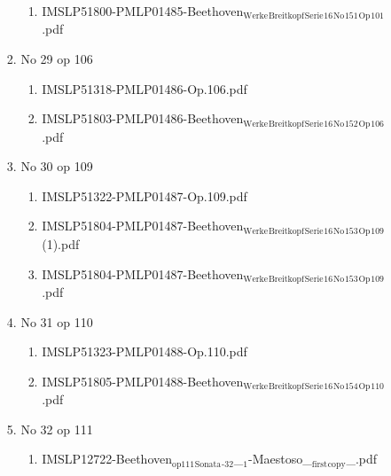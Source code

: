 \documentclass[11pt]{article}
\begin{document}
\begin{enumerate}
\begin{enumerate}
\begin{enumerate}
\begin{enumerate}
\item IMSLP51800-PMLP01485-Beethoven$_{\text{Werke}}$$_{\text{Breitkopf}}$$_{\text{Serie}}$$_{\text{16}}$$_{\text{No}}$$_{\text{151}}$$_{\text{Op}}$$_{\text{101}}$.pdf
\label{sec-1-1-1-1-44-9-6-8-65-3}
\end{enumerate}

\item No 29 op 106
\label{sec-1-1-1-1-44-9-6-8-66}
\begin{enumerate}
\item IMSLP51318-PMLP01486-Op.106.pdf
\label{sec-1-1-1-1-44-9-6-8-66-1}

\item IMSLP51803-PMLP01486-Beethoven$_{\text{Werke}}$$_{\text{Breitkopf}}$$_{\text{Serie}}$$_{\text{16}}$$_{\text{No}}$$_{\text{152}}$$_{\text{Op}}$$_{\text{106}}$.pdf
\label{sec-1-1-1-1-44-9-6-8-66-2}
\end{enumerate}

\item No 30 op 109
\label{sec-1-1-1-1-44-9-6-8-67}
\begin{enumerate}
\item IMSLP51322-PMLP01487-Op.109.pdf
\label{sec-1-1-1-1-44-9-6-8-67-1}

\item IMSLP51804-PMLP01487-Beethoven$_{\text{Werke}}$$_{\text{Breitkopf}}$$_{\text{Serie}}$$_{\text{16}}$$_{\text{No}}$$_{\text{153}}$$_{\text{Op}}$$_{\text{109}}$ (1).pdf
\label{sec-1-1-1-1-44-9-6-8-67-2}

\item IMSLP51804-PMLP01487-Beethoven$_{\text{Werke}}$$_{\text{Breitkopf}}$$_{\text{Serie}}$$_{\text{16}}$$_{\text{No}}$$_{\text{153}}$$_{\text{Op}}$$_{\text{109}}$.pdf
\label{sec-1-1-1-1-44-9-6-8-67-3}
\end{enumerate}

\item No 31 op 110
\label{sec-1-1-1-1-44-9-6-8-68}
\begin{enumerate}
\item IMSLP51323-PMLP01488-Op.110.pdf
\label{sec-1-1-1-1-44-9-6-8-68-1}

\item IMSLP51805-PMLP01488-Beethoven$_{\text{Werke}}$$_{\text{Breitkopf}}$$_{\text{Serie}}$$_{\text{16}}$$_{\text{No}}$$_{\text{154}}$$_{\text{Op}}$$_{\text{110}}$.pdf
\label{sec-1-1-1-1-44-9-6-8-68-2}
\end{enumerate}

\item No 32 op 111
\label{sec-1-1-1-1-44-9-6-8-69}
\begin{enumerate}
\item IMSLP12722-Beethoven$_{\text{op111}}$$_{\text{Sonata}}$$_{\text{-32}}$\_$_{\text{1}}$-Maestoso\_$_{\text{first}}$$_{\text{copy}}$\_.pdf
\label{sec-1-1-1-1-44-9-6-8-69-1}


\end{enumerate}
\end{enumerate}
\end{enumerate}
\end{enumerate}
\end{document}
